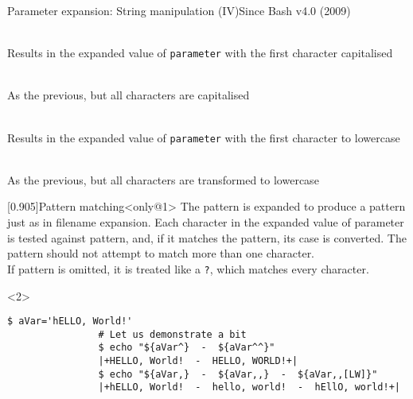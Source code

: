 \begin{frame}[fragile]{Parameter expansion: String manipulation (IV)}{Since Bash v4.0 (2009)}
    \vspace{-3mm}
    \begin{description}
        \item[First uppercase:] \\
            {\small
                Results in the expanded value of \texttt{parameter} with the first character capitalised
            }
        \item[All uppercase:] \\
            {\small
                As the previous, but all characters are capitalised
            }
        \item[First lowercase:] \\
            {\small
                Results in the expanded value of \texttt{parameter} with the first character to lowercase
            }
        \item[All lowercase:] \\
            {\small
                As the previous, but all characters are transformed to lowercase
            }
    \end{description}
    \begin{overlayarea}{\textwidth}{0.4\textheight}
        \vspace{-3mm}
        \begin{varblock}{}[0.905\textwidth]{Pattern matching}<only@1>
            \small
            The pattern is expanded to produce a pattern just as in filename expansion.
            Each character in the expanded value of parameter is tested against pattern, and, if it matches the pattern, its case is converted.
            \alert{The pattern should not attempt to match more than one character.}\\
            If pattern is omitted, it is treated like a \texttt{?}, which matches every character.
        \end{varblock}
        \begin{onlyenv}<2>
            \begin{lstlisting}[style=MyBash, style=oddnumbers, aboveskip=5mm]
                $ aVar='hELLO, World!'
                # Let us demonstrate a bit
                $ echo "${aVar^}  -  ${aVar^^}"
                |+HELLO, World!  -  HELLO, WORLD!+|
                $ echo "${aVar,}  -  ${aVar,,}  -  ${aVar,,[LW]}"
                |+hELLO, World!  -  hello, world!  -  hEllO, world!+|
            \end{lstlisting}
        \end{onlyenv}
    \end{overlayarea}
\end{frame}
